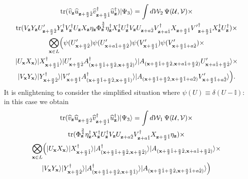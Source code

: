 \documentclass[12pt]{amsart}
\newcommand{\tr}{\operatorname{tr}}
\theoremstyle{definition}
\theoremstyle{remark}
\numberwithin{equation}{section}
\begin{document}
\begin{multline}	
	\tr(\widehat{v}_{\mathbf{z}}\widehat{u}_{\mathbf{z}+\frac{a}{2}\hat{2}}\widehat{v}^\dag_{\mathbf{z}+\frac{a}{2}\hat{1}}\widehat{u}_{\mathbf{z}}^\dag)|\Psi_3\rangle = \int  d\mathcal{W}_2 \, \Psi(\mathcal{U},\mathcal{V})  \times \\
	\tr(V_\mathbf{z} Y_\mathbf{z}U_{\mathbf{z}+\frac{a}{2}\hat{2}}' Y^\dag_\mathbf{z} V^\dag_\mathbf{z} U_{\mathbf{z}} X_{\mathbf{z}} \eta_{\mathbf{z}}\Phi_{\mathbf{z}}^{\frac34} \eta^\dag_{\mathbf{z}} X_{\mathbf{z}}^\dag U^\dag_{\mathbf{z}}V_\mathbf{z}  U_{\mathbf{z}+a\hat{2}} V^\dag_{\mathbf{z}+a\hat{1}} X_{\mathbf{z}+\frac{a}{2}\hat{1}}  {V'}^\dag_{\mathbf{z}+\frac{a}{2}\hat{1}} X^\dag_\mathbf{z} U^\dag_\mathbf{z} )\times\\
	\bigotimes_{\mathbf{x}\in L}\Bigl( \psi(U_{\mathbf{x}+\frac{a}{2}\hat{2}}')\psi(U_{\mathbf{x}+{a}\hat{1}+\frac{a}{2}\hat{2}}')\psi(V_{\mathbf{x}+\frac{a}{2}\hat{1}}')\psi(V_{\mathbf{x}+\frac{a}{2}\hat{1}+{a}\hat{2}}') \times\\
	|U_\mathbf{x} X_\mathbf{x}\rangle|X^\dag_{\mathbf{x}+\frac{a}{2}\hat{1}}\rangle |U_{\mathbf{x}+\frac{a}{2}\hat{2}}' A_{(\mathbf{x}+\frac{a}{2}\hat{1}+\frac{a}{2}\hat{2}, \mathbf{x}+\frac{a}{2}\hat{2})}^\dag   \rangle|A_{(\mathbf{x}+\frac{a}{2}\hat{1}+\frac{a}{2}\hat{2}, \mathbf{x}+{a}\hat{1}+\frac{a}{2}\hat{2})}U_{\mathbf{x}+{a}\hat{1}+\frac{a}{2}\hat{2}}'\rangle \times \\ 
	|V_\mathbf{x} Y_\mathbf{x}\rangle|Y^\dag_{\mathbf{x}+\frac{a}{2}\hat{2}}\rangle|V_{\mathbf{x}+\frac{a}{2}\hat{1}}'A_{(\mathbf{x}+\frac{a}{2}\hat{1}+\frac{a}{2}\hat{2}, \mathbf{x}+\frac{a}{2}\hat{1})}^\dag\rangle |A_{(\mathbf{x}+\frac{a}{2}\hat{1}+\frac{a}{2}\hat{2}, \mathbf{x}+\frac{a}{2}\hat{1}+{a}\hat{2})}V_{\mathbf{x}+\frac{a}{2}\hat{1}+{a}\hat{2}}'\rangle \Bigr).
\end{multline}
It is enlightening to consider the simplified situation where $\psi(U) \equiv \delta(U-\mathbb{I})$: in this case we obtain
\begin{multline}	
	\tr(\widehat{v}_{\mathbf{z}}\widehat{u}_{\mathbf{z}+\frac{a}{2}\hat{2}}\widehat{v}^\dag_{\mathbf{z}+\frac{a}{2}\hat{1}}\widehat{u}_{\mathbf{z}}^\dag)|\Psi_3\rangle = \int  d\mathcal{W}_1 \, \Psi(\mathcal{U},\mathcal{V}) \times\\ 
	\tr(   \Phi_{\mathbf{z}}^{\frac34} \eta^\dag_{\mathbf{z}} X_{\mathbf{z}}^\dag U^\dag_{\mathbf{z}}V_\mathbf{z}  U_{\mathbf{z}+a\hat{2}} V^\dag_{\mathbf{z}+a\hat{1}} X_{\mathbf{z}+\frac{a}{2}\hat{1}}  \eta_{\mathbf{z}} )\times\\\bigotimes_{\mathbf{x}\in L}\Bigl( 
	|U_\mathbf{x} X_\mathbf{x}\rangle|X^\dag_{\mathbf{x}+\frac{a}{2}\hat{1}}\rangle | A_{(\mathbf{x}+\frac{a}{2}\hat{1}+\frac{a}{2}\hat{2}, \mathbf{x}+\frac{a}{2}\hat{2})}^\dag   \rangle|A_{(\mathbf{x}+\frac{a}{2}\hat{1}+\frac{a}{2}\hat{2}, \mathbf{x}+{a}\hat{1}+\frac{a}{2}\hat{2})}\rangle \times \\ 
	|V_\mathbf{x} Y_\mathbf{x}\rangle|Y^\dag_{\mathbf{x}+\frac{a}{2}\hat{2}}\rangle|A_{(\mathbf{x}+\frac{a}{2}\hat{1}+\frac{a}{2}\hat{2}, \mathbf{x}+\frac{a}{2}\hat{1})}^\dag\rangle |A_{(\mathbf{x}+\frac{a}{2}\hat{1}+\frac{a}{2}\hat{2}, \mathbf{x}+\frac{a}{2}\hat{1}+{a}\hat{2})}\rangle \Bigr)
\end{multline}
\end{document}
